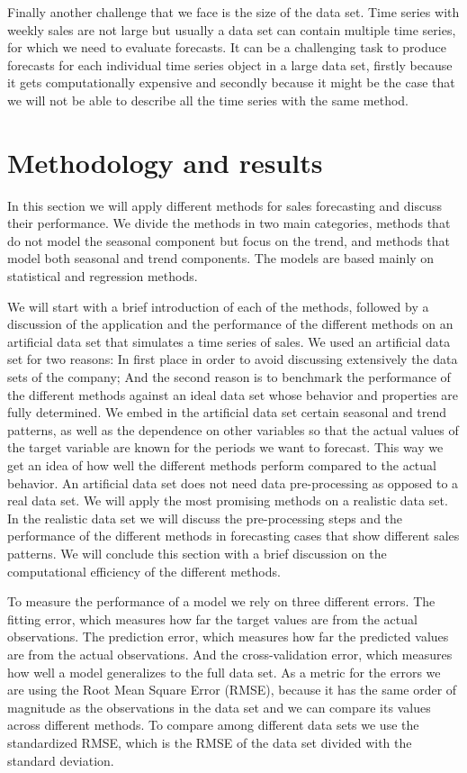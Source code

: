 \documentclass[12pt, letterpaper]{article}\usepackage[]{graphicx}\usepackage[]{color}
\begin{document}
Finally another challenge that we face is the size of the data set. Time series with weekly sales are not large but usually a data set can contain multiple time series, for which we need to evaluate forecasts. It can be a challenging task to produce forecasts for each individual time series object in a large data set, firstly because it gets computationally expensive and secondly because it might be the case that we will not be able to describe all the time series with the same method. 

\section{Methodology and results}

In this section we will apply different methods for sales forecasting and discuss their performance. We divide the methods in two main categories, methods that do not model the seasonal component but focus on the trend, and methods that model both seasonal and trend components. The models are based mainly on statistical and regression methods.

We will start with a brief introduction of each of the methods, followed by a discussion of the application and the performance of the different methods on an artificial data set that simulates a time series of sales. We used an artificial data set for two reasons: In first place in order to avoid discussing extensively the data sets of the company; And the second reason is to benchmark the performance of the different methods against an ideal data set whose behavior and properties are fully determined. We embed in the artificial data set certain seasonal and trend patterns, as well as the dependence on other variables so that the actual values of the target variable are known for the periods we want to forecast. This way we get an idea of how well the different methods perform compared to the actual behavior. An artificial data set does not need data pre-processing as opposed to a real data set. We will apply the most promising methods on a realistic data set. In the realistic data set we will discuss the pre-processing steps and the performance of the different methods in forecasting cases that show different sales patterns. We will conclude this section with a brief discussion on the computational efficiency of the different methods.

To measure the performance of a model we rely on three different errors. The fitting error, which measures how far the target values are from the actual observations. The prediction error, which measures how far the predicted values are from the actual observations. And the cross-validation error, which measures how well a model generalizes to the full data set. As a metric for the errors we are using the Root Mean Square Error (RMSE), because it has the same order of magnitude as the observations in the data set and we can compare its values across different methods. To compare among different data sets we use the standardized RMSE, which is the RMSE of the data set divided with the standard deviation. 
\end{document}

